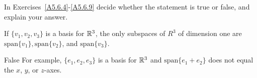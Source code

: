\documentclass{article}
\begin{document}

\vspace*{-0.2in}

\problemlabel

In Exercises~\ref{A5.6.4}-\ref{A5.6.9} decide whether the statement is true or false, and explain your answer.

\begin{exercise}  \label{A5.6.7}
If $\{v_1,v_2,v_3\}$ is a basis for $\mathbb R^3$, the only subspaces of $R^3$ of dimension one are $\text{span}\{v_1\}, \text{span}\{v_2\}$, and $\text{span}\{v_3\}$. 
\begin{solution}
\ans False 
\soln For example, $\{e_1,e_2,e_3\}$ is a basis for $\mathbb R^3$ and $\text{span}\{e_1+e_2\}$ does not equal the $x$, $y$, or $z$-axes.
\end{solution}
\end{exercise}


\end{document}
